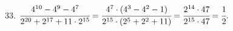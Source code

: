 33. $\cfrac{4^{10}-4^9-4^7}{2^{20}+2^{17}+11\cdot2^{15}}=\cfrac{4^7\cdot(4^3-4^2-1)}{2^{15}\cdot(2^5+2^2+11)}=
\cfrac{2^{14}\cdot47}{2^{15}\cdot47}=\cfrac{1}{2}.$\\
